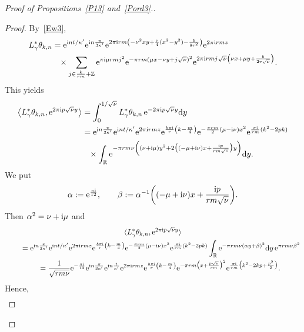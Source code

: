\documentclass[10pt,a4paper]{amsart}
\newcommand\Z{{\mathbb Z}}
\newcommand\R{{\mathbb R}}
\newcommand\la{\langle}
\newcommand\ra{\rangle}
\numberwithin{equation}{section}
\begin{document}
\begin{proof}[Proof of Propositions~\ref{P13} and~\ref{Pord3}.]
\begin{proof}
By~\eqref{Ew3},
\begin{align*}
L^*_{\gamma} \theta_{k,n}&={\rm e}^{{\rm i}nt/\kappa'}{\rm e}^{{\rm i}n\frac{\pi}{3\kappa'}}{\rm e}^{2\pi {\rm i}rm\left(-\nu^2xy+\frac\nu4(x^2-y^2)-\frac b{8r^2}\right)}{\rm e}^{2\pi {\rm i}rmz}
\\
&\phantom{=}\times \sum_{j\in \frac k{rm}+\Z}{\rm e}^{\pi {\rm i} \mu rmj^2}{\rm e}^{-\pi rm(\mu x-\nu y+j\sqrt\nu)^2}{\rm e}^{2\pi {\rm i} rmj\sqrt\nu \left(\nu x+\mu y+\frac b{2r{\sqrt\nu}}\right)}.
\end{align*}
This yields
\begin{align*}
\big\la L^*_{\gamma} \theta_{k,n}, {\rm e}^{2\pi {\rm i}p\sqrt\nu y}\big\ra &= \int_0^{1/\sqrt\nu}L^*_{\gamma} \theta_{k,n} \, {\rm e}^{-2\pi {\rm i}p\sqrt\nu y}{\rm d}y
\\
&={\rm e}^{{\rm i}n\frac{\pi}{3\kappa'}}{\rm e}^{{\rm i}nt/\kappa'}{\rm e}^{2\pi {\rm i}rmz} {\rm e}^{\frac{b\pi {\rm i}}r\left(k-\frac m4\right)} {\rm e}^{-\frac{\pi rm}2\left(\mu-{\rm i}\nu\right)x^2} {\rm e}^{\frac{\pi {\rm i}}{rm}(k^2-2pk)}
\\
&\phantom{=}\times\int_{\R}{\rm e}^{-\pi rm\nu\left((\nu+{\rm i}\mu)y^2+2\big((-\mu+{\rm i}\nu)x+\frac{{\rm i}p}{rm\sqrt\nu}\big)y\right)}{\rm d}y.
\end{align*}
We put
\begin{gather*}
\alpha:={\rm e}^{\frac{\pi {\rm i}}{12}},\qquad
\beta:=\alpha^{-1}\bigg((-\mu+{\rm i}\nu)x+\frac{{\rm i}p}{rm\sqrt\nu}\bigg).
\end{gather*}
Then $\alpha^2=\nu +{\rm i}\mu$ and
\begin{gather*}
\la L^*_{\gamma} \theta_{k,n}, {\rm e}^{2\pi {\rm i}p\sqrt\nu y}\ra
\\ \qquad
{}= {\rm e}^{{\rm i}n\frac{\pi}{3\kappa'}}{\rm e}^{{\rm i}nt/\kappa'}{\rm e}^{2\pi {\rm i}rmz} {\rm e}^{\frac{b\pi {\rm i}}r\left(k-\frac m4\right)} {\rm e}^{-\frac{\pi rm}2\left(\mu-{\rm i}\nu\right)x^2} {\rm e}^{\frac{\pi {\rm i}}{rm}(k^2-2pk)}
\int_{\R}{\rm e}^{-\pi rm\nu (\alpha y+\beta)^2}{\rm d}y \, {\rm e}^{\pi rm\nu\beta^2}
\\ \qquad
= \frac1{\sqrt{rm\nu}} {\rm e}^{-\frac{\pi {\rm i}}{12}} {\rm e}^{{\rm i}n\frac{\pi}{3\kappa'}}{\rm e}^{{\rm i}n\frac t{\kappa'}}{\rm e}^{2\pi {\rm i}rmz} {\rm e}^{\frac{b\pi {\rm i}}r\left(k-\frac m4\right)} {\rm e}^{-\pi rm\big(x+\frac{p\sqrt\nu}{rm}\big)^2}{\rm e}^{\frac{\pi {\rm i}}{rm}\big(k^2-2kp+\frac{p^2}2\big)}.
\end{gather*}
Hence,
\begin{align*}

\end{align*}
\end{proof}
\end{proof}
\end{document}
